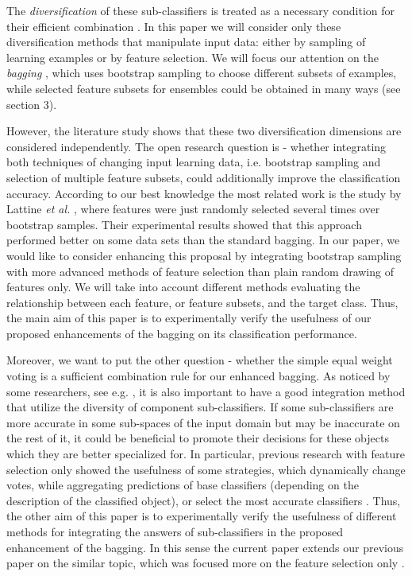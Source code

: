 \documentclass[runningheads]{llncs}
\begin{document}
The {\em diversification} of these sub-classifiers is treated as a necessary
condition for their efficient combination \cite{Dietrich,Valenti}. In this
paper we will consider only these diversification methods that manipulate
input data: either by sampling of learning examples or by feature selection.
 We will focus our attention on the {\em bagging} \cite{Bre}, which uses
bootstrap sampling to choose different subsets of examples, while selected
feature subsets for ensembles could be obtained in many ways (see section
3).

However, the literature study shows that these two diversification
dimensions are considered independently. The open research question is -
whether integrating both techniques of changing input learning data, i.e.
bootstrap sampling and selection of multiple feature subsets, could
additionally improve the classification accuracy.  According to our best
knowledge the most related work is the study by Lattine {\em et al.}
\cite{lat2}, where features were just randomly selected several times over
 bootstrap samples. Their experimental results showed that this approach
 performed better on some data sets than the standard bagging.
In our paper, we would like to consider enhancing this proposal by
integrating bootstrap sampling with more advanced methods of feature
selection than plain random drawing of features only.  We will take into
account different methods evaluating the relationship between each feature,
or feature subsets, and the target class. Thus, the main aim of this paper
is to experimentally verify the usefulness of our proposed enhancements of
the bagging on its classification performance.

Moreover, we want to put the other question - whether the simple equal
weight voting is a sufficient combination rule for our enhanced bagging. As
noticed by some researchers, see e.g. \cite{Tsym2,Tsym3}, it is also
important to have a good integration method that utilize the diversity of
component sub-classifiers. If some sub-classifiers are more accurate in some
sub-spaces of the input domain but may be inaccurate on the rest of it, it
could be beneficial to promote their decisions for these objects which they
are better specialized for. In particular, previous research with feature
selection only showed the usefulness of some  strategies, which dynamically
change votes, while aggregating predictions of base classifiers (depending
on the description of the classified object), or select the most accurate
classifiers \cite{Tsym2}. Thus, the other aim of this paper is to
experimentally verify the usefulness of different methods for integrating
the answers of sub-classifiers in the proposed enhancement of the bagging.
In this sense the current paper extends our previous paper on the similar
topic, which was focused more on the feature selection only
\cite{StefKacz04}.
\end{document}
